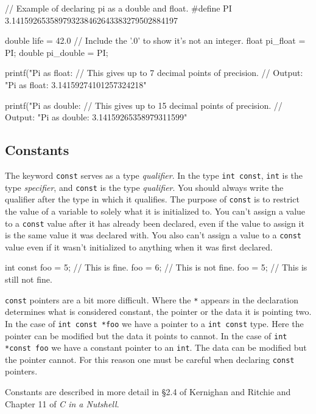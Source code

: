 \documentclass[11pt]{article}
\begin{document}
\begin{codelisting}{}
// Example of declaring pi as a double and float.
#define PI 3.141592653589793238462643383279502884197

double life = 42.0 // Include the '.0' to show it's not an integer.
float pi_float = PI;
double pi_double = PI;

printf("Pi as float: %
// This gives up to 7 decimal points of precision.
// Output: "Pi as float: 3.14159274101257324218"

printf("Pi as double: %
// This gives up to 15 decimal points of precision.
// Output: "Pi as double: 3.14159265358979311599"
\end{codelisting}


\subsection{Constants}

The keyword \texttt{const} serves as a type \emph{qualifier}. In the type
\texttt{int const}, \texttt{int} is the type \emph{specifier}, and
\texttt{const} is the type \emph{qualifier}. You should always write the qualifier after the type in
which it qualifies.  The purpose of \texttt{const} is to restrict the value of a
variable to solely what it is initialized to. You can't assign a value to a
\texttt{const} value after it has already been declared, even if the value to
assign it is the same value it was declared with. You also can't assign a value
to a \texttt{const} value even if it wasn't initialized to anything when it was
first declared.

\begin{codelisting}{}
int const foo = 5;  // This is fine.
foo = 6;            // This is not fine.
foo = 5;            // This is still not fine.
\end{codelisting}

\noindent \texttt{const} pointers are a bit more difficult. Where the \texttt{*} appears
in the declaration determines what is considered constant, the pointer or the
data it is pointing two. In the case of \texttt{int const *foo} we have a
pointer to a \texttt{int const} type. Here the pointer can be modified but the
data it points to cannot. In the case of \texttt{int *const foo} we have a
constant pointer to an \texttt{int}. The data can be modified but the pointer
cannot. For this reason one must be careful when declaring \texttt{const}
pointers.

Constants are described in more detail in \S 2.4 of Kernighan and Ritchie and
Chapter 11 of \emph{C in a Nutshell}.
\end{document}
